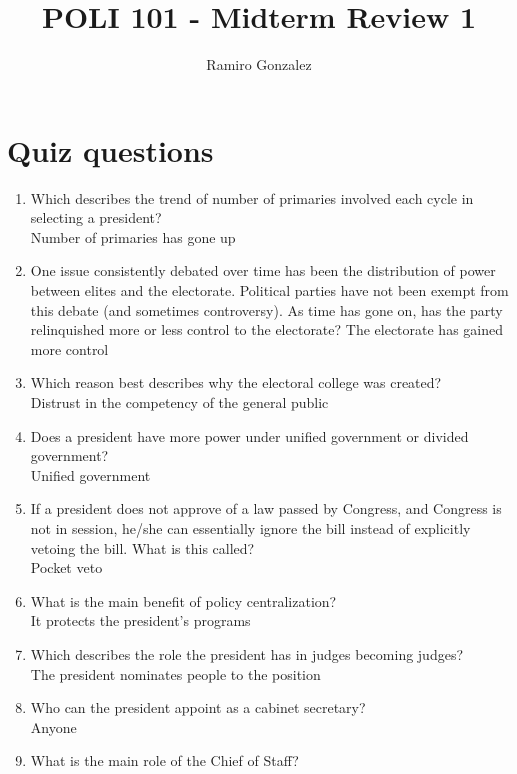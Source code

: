 \documentclass{article}
\title{POLI 101 - Midterm Review 1}
\author{Ramiro Gonzalez}
\begin{document}
\maketitle
\section*{ Quiz questions}
\begin{enumerate}
    \item Which describes the trend of number of primaries involved each cycle in selecting a president?\\
    \color{red}Number of primaries has gone up\color{black} 
    \item One issue consistently debated over time has been the distribution of power between elites and the electorate. Political parties have not been exempt from this debate (and sometimes controversy). As time has gone on, has the party relinquished more or less control to the electorate?
    \color{red}The electorate has gained more control
\color{black}
    \item Which reason best describes why the electoral college was created?\\
    \color{red} Distrust in the competency of the general public
 \color{black} 
    \item Does a president have more power under unified government or divided government?\\
    \color{red} Unified government
 \color{black} 
    \item If a president does not approve of a law passed by Congress, and Congress is not in session, he/she can essentially ignore the bill instead of explicitly vetoing the bill. What is this called?\\
    \color{red}Pocket veto \color{black} 
    \item What is the main benefit of policy centralization?\\
    \color{red}It protects the president's programs \color{black} 
    \item Which describes the role the president has in judges becoming judges? \\
    \color{red}  The president nominates people to the position \color{black} 
    \item Who can the president appoint as a cabinet secretary? \\
    \color{red} Anyone \color{black} 
    \item What is the main role of the Chief of Staff? \\

\end{enumerate}
\end{document}

